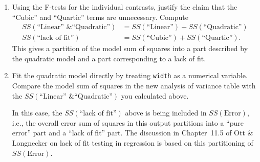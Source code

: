 \documentclass[a4paper, 12pt]{article}
\theoremstyle{plain}
\theoremstyle{definition}
\theoremstyle{remark}
\begin{document}
{\begin{enumerate}
\begin{enumerate}
\item In the SAS output, verify that the sums of squares for these four contrasts add up to the sum of squares for the model in Part~(b) above.
\end{enumerate}
\item Using the F-tests for the individual contrasts, justify the claim that the ``Cubic'' and ``Quartic'' terms are unnecessary.  Compute 
\begin{align*}
SS(\text{``Linear'' \& ``Quadratic''}) & = SS(\text{``Linear''}) + SS(\text{``Quadratic''}) \\
SS(\text{``lack of fit''}) & = SS(\text{``Cubic''}) + SS(\text{``Quartic''}).
\end{align*}
This gives a partition of the model sum of squares into a part described by the quadratic model and a part corresponding to a lack of fit.  
\item Fit the quadratic model directly by treating {\tt width} as a numerical variable.  Compare the model sum of squares in the new analysis of variance table with the $SS(\text{``Linear'' \& ``Quadratic''})$ you calculated above.  

In this case, the $SS(\text{``lack of fit''})$ above is being included in $SS(\text{Error})$, i.e., the overall error sum of squares in this output partitions into a ``pure error'' part and a ``lack of fit'' part.  The discussion in Chapter~11.5 of Ott \& Longnecker on lack of fit testing in regression is based on this partitioning of $SS(\text{Error})$.  
\end{enumerate}


}
\end{document}
